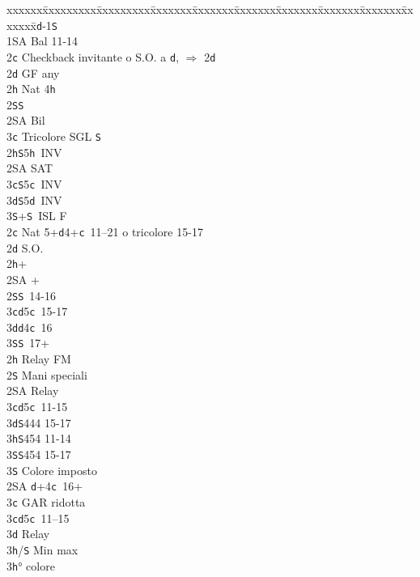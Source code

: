\documentclass[a4paper,italian]{article}
\newcommand{\BS}{\small{\texttt{S}}}
\newcommand{\BC}{\small{\texttt{c}}}
\newcommand{\BD}{\small{\texttt{d}}}
\newcommand{\BH}{\small{\texttt{h}}}
\newenvironment{bidtable}
{\begin{tabbing}

    xxxxxx\=xxxxxxxxx\=xxxxxxxxx\=xxxxxxx\=xxxxxxx\=xxxxxxx\=xxxxxxx\=xxxxxxx\=xxxxxxx\=xxxxxxx\=\kill}
{\end{tabbing} }%
\begin{document}
\begin{multicols}{2}
    \begin{bidtable}
        1\BD-1\BS\+\\
        1\small{SA} \> Bal 11-14\+\\
        2\BC \> Checkback invitante o S.O. a \BD , $\Rightarrow$ 2\BD \\
        2\BD \> GF any\+\\
        2\BH \> Nat 4\BH \\
        2\BS {}\BS \\
        2\small{SA} \> Bil\\
        3\BC \> Tricolore SGL \BS \-\\
        2\BH {}\BS 5\BH\ INV\\
        2\small{SA} \small{SA}T\\
        3\BC {}\BS 5\BC\ INV\\
        3\BD {}\BS 5\BD\ INV\\
        3\BS {}+\BS\ ISL F\-\\
        2\BC \> Nat 5+\BD 4+\BC\ 11--21 o tricolore 15-17\+\\
        2\BD \> S.O.\+\\
        2\BH {}+\\
        2\small{SA} +\\
        2\BS {}\BS\ 14-16\\
        3\BC {}\BD 5\BC\ 15-17\\
        3\BD {}\BD 4\BC\ 16\\
        3\BS {}\BS\ 17+\-\\
        2\BH \> Relay FM\+\\
        2\BS \> Mani speciali\+\\
        2\small{SA} \> Relay\+\\
        3\BC {}\BD 5\BC\ 11-15\\
        3\BD {}\BS 444 15-17\\
        3\BH {}\BS 454 11-14\\
        3\BS {}\BS 454 15-17\-\\
        3\BS \> Colore imposto\-\\
        2\small{SA} \BD +4\BC\ 16+\+\\
        3\BC \> GAR ridotta\-\\
        3\BC {}\BD 5\BC\ 11--15\+\\
        3\BD \> Relay\+\\
        3\BH/\BS \> Min max\-\\
        3\BH {}° colore\\

\end{bidtable}
\end{multicols}
\end{document}
